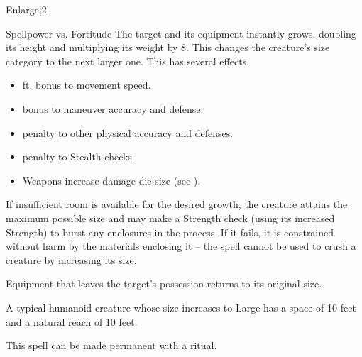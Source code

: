 \begin{spellsection}{Enlarge}[2]
    \begin{spellheader}
    \end{spellheader}
    \begin{spellcontent}
        \begin{spelltargetinginfo}
        \end{spelltargetinginfo}
        \begin{spelleffects}
            \begin{spellattack}{Spellpower vs. Fortitude}
                \spellsuccess The target and its equipment instantly grows, doubling its height and multiplying its weight by 8. This changes the creature's size category to the next larger one. This has several effects.
                \begin{itemize}
                    \item {} ft. bonus to movement speed.
                    \item {} bonus to maneuver accuracy and defense.
                    \item {} penalty to other physical accuracy and defenses.
                    \item {} penalty to Stealth checks.
                    \item Weapons increase damage die size (see ).
                \end{itemize}
                \par If insufficient room is available for the desired growth, the creature attains the maximum possible size and may make a Strength check (using its increased Strength) to burst any enclosures in the process. If it fails, it is constrained without harm by the materials enclosing it -- the spell cannot be used to crush a creature by increasing its size.
                \par Equipment that leaves the target's possession returns to its original size.
            \end{spellattack}
            \spelldur \durshort \dismissable
        \end{spelleffects}
    \end{spellcontent}
    \begin{spellfooter}
        \spellnotes A typical humanoid creature whose size increases to Large has a space of 10 feet and a natural reach of 10 feet. \sizingspellnotes

        This spell can be made permanent with a  ritual.
        \miscastrandom
    \end{spellfooter}
\end{spellsection}

